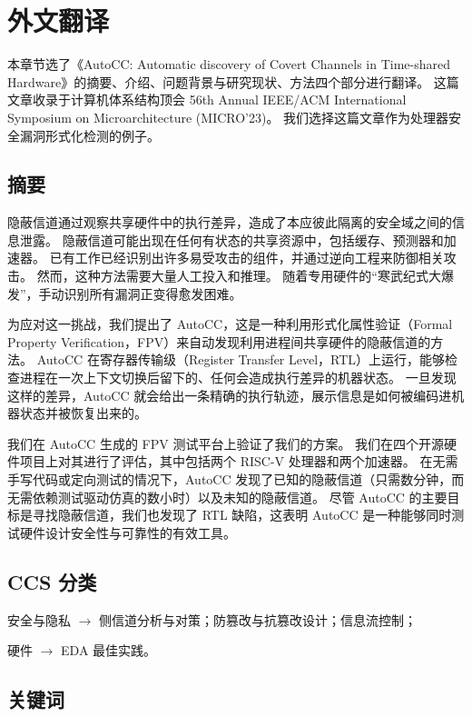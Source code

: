 \cleardoublepage

\newrefsection

\chapter{外文翻译}

本章节选了《AutoCC: Automatic discovery of Covert Channels in Time-shared Hardware》的摘要、介绍、问题背景与研究现状、方法四个部分进行翻译。
这篇文章收录于计算机体系结构顶会 56th Annual IEEE/ACM International Symposium on Microarchitecture (MICRO’23)。
我们选择这篇文章作为处理器安全漏洞形式化检测的例子。


\section*{摘要}
隐蔽信道通过观察共享硬件中的执行差异，造成了本应彼此隔离的安全域之间的信息泄露。
隐蔽信道可能出现在任何有状态的共享资源中，包括缓存、预测器和加速器。
已有工作已经识别出许多易受攻击的组件，并通过逆向工程来防御相关攻击。
然而，这种方法需要大量人工投入和推理。
随着专用硬件的“寒武纪式大爆发”，手动识别所有漏洞正变得愈发困难。

为应对这一挑战，我们提出了 AutoCC，这是一种利用形式化属性验证（Formal Property Verification，FPV）来自动发现利用进程间共享硬件的隐蔽信道的方法。
AutoCC 在寄存器传输级（Register Transfer Level，RTL）上运行，能够检查进程在一次上下文切换后留下的、任何会造成执行差异的机器状态。
一旦发现这样的差异，AutoCC 就会给出一条精确的执行轨迹，展示信息是如何被编码进机器状态并被恢复出来的。

我们在 AutoCC 生成的 FPV 测试平台上验证了我们的方案。
我们在四个开源硬件项目上对其进行了评估，其中包括两个 RISC-V 处理器和两个加速器。
在无需手写代码或定向测试的情况下，AutoCC 发现了已知的隐蔽信道（只需数分钟，而无需依赖测试驱动仿真的数小时）以及未知的隐蔽信道。
尽管 AutoCC 的主要目标是寻找隐蔽信道，我们也发现了 RTL 缺陷，这表明 AutoCC 是一种能够同时测试硬件设计安全性与可靠性的有效工具。

\section*{CCS 分类}
安全与隐私 $\rightarrow$ 侧信道分析与对策；防篡改与抗篡改设计；信息流控制；

硬件  $\rightarrow$ EDA 最佳实践。


\section*{关键词}

